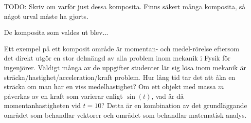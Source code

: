 \begin{binge}

TODO: Skriv om varför just dessa komposita. Finns säkert många komposita, så något urval måste ha gjorts.

De komposita som valdes ut blev...

Ett exempel på ett komposit område är momentan- och medel-rörelse eftersom det
direkt utgör en stor delmängd av alla problem inom mekanik i Fysik för
ingenjörer. Väldigt många av de uppgifter studenter lär sig lösa inom mekanik
är sträcka/hastighet/acceleration/kraft problem. Hur lång tid tar det att åka
en sträcka om man har en viss medelhastighet? Om ett objekt med massa $m$
påverkas av en kraft som varierar enligt $\sin(t)$, vad är då
momentanhastigheten vid $t=10$? Detta är en kombination av det grundläggande
området som behandlar vektorer och området som behandlar matematisk analys.

\end{binge}
